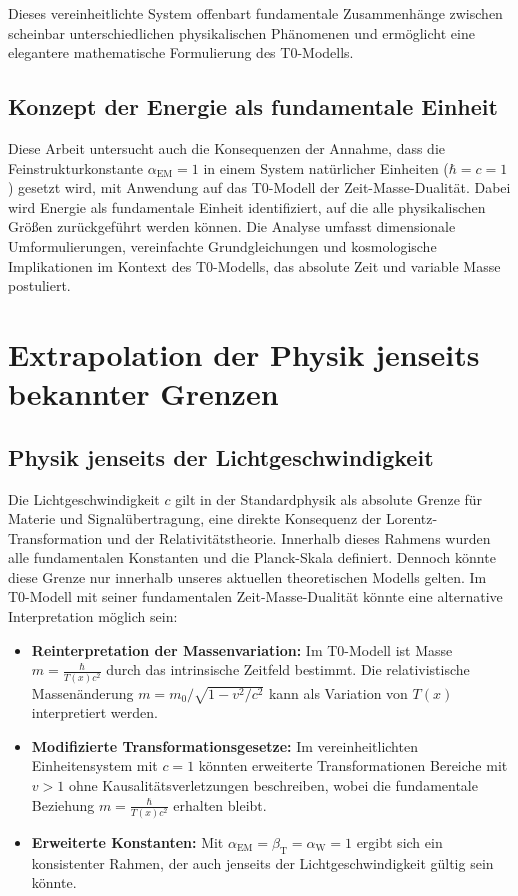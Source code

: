 \documentclass[12pt,a4paper]{article}
\newcommand{\Tfield}{T(x)}
\newcommand{\betaT}{\beta_{\text{T}}}
\newcommand{\alphaEM}{\alpha_{\text{EM}}}
\newcommand{\alphaW}{\alpha_{\text{W}}}
\begin{document}
	Dieses vereinheitlichte System offenbart fundamentale Zusammenhänge zwischen scheinbar unterschiedlichen physikalischen Phänomenen und ermöglicht eine elegantere mathematische Formulierung des T0-Modells.
	
	\subsection{Konzept der Energie als fundamentale Einheit}
	
	Diese Arbeit untersucht auch die Konsequenzen der Annahme, dass die Feinstrukturkonstante \(\alphaEM = 1\) in einem System natürlicher Einheiten (\(\hbar = c = 1\)) gesetzt wird, mit Anwendung auf das T0-Modell der Zeit-Masse-Dualität. Dabei wird Energie als fundamentale Einheit identifiziert, auf die alle physikalischen Größen zurückgeführt werden können. Die Analyse umfasst dimensionale Umformulierungen, vereinfachte Grundgleichungen und kosmologische Implikationen im Kontext des T0-Modells, das absolute Zeit und variable Masse postuliert.
	
	\section{Extrapolation der Physik jenseits bekannter Grenzen}
	
	\subsection{Physik jenseits der Lichtgeschwindigkeit}
	
	Die Lichtgeschwindigkeit $c$ gilt in der Standardphysik als absolute Grenze für Materie und Signalübertragung, eine direkte Konsequenz der Lorentz-Transformation und der Relativitätstheorie. Innerhalb dieses Rahmens wurden alle fundamentalen Konstanten und die Planck-Skala definiert. Dennoch könnte diese Grenze nur innerhalb unseres aktuellen theoretischen Modells gelten. Im T0-Modell mit seiner fundamentalen Zeit-Masse-Dualität könnte eine alternative Interpretation möglich sein:
	
	\begin{itemize}
		\item \textbf{Reinterpretation der Massenvariation:} Im T0-Modell ist Masse $m = \frac{\hbar}{\Tfield c^2}$ durch das intrinsische Zeitfeld bestimmt. Die relativistische Massenänderung $m = m_0/\sqrt{1-v^2/c^2}$ kann als Variation von $\Tfield$ interpretiert werden.
		\item \textbf{Modifizierte Transformationsgesetze:} Im vereinheitlichten Einheitensystem mit $c = 1$ könnten erweiterte Transformationen Bereiche mit $v > 1$ ohne Kausalitätsverletzungen beschreiben, wobei die fundamentale Beziehung $m = \frac{\hbar}{\Tfield c^2}$ erhalten bleibt.
		\item \textbf{Erweiterte Konstanten:} Mit $\alphaEM = \betaT = \alphaW = 1$ ergibt sich ein konsistenter Rahmen, der auch jenseits der Lichtgeschwindigkeit gültig sein könnte.
	\end{itemize}
	
\end{document}
